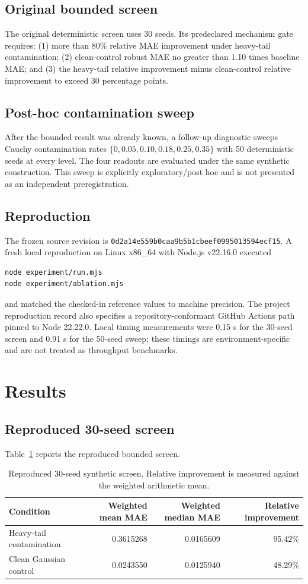 \documentclass[10pt]{article}
\begin{document}
\subsection{Original bounded screen}
The original deterministic screen uses 30 seeds. Its predeclared mechanism gate requires: (1) more than 80\% relative MAE improvement under heavy-tail contamination; (2) clean-control robust MAE no greater than 1.10 times baseline MAE; and (3) the heavy-tail relative improvement minus clean-control relative improvement to exceed 30 percentage points.

\subsection{Post-hoc contamination sweep}
After the bounded result was already known, a follow-up diagnostic sweeps Cauchy contamination rates $\{0,0.05,0.10,0.18,0.25,0.35\}$ with 50 deterministic seeds at every level. The four readouts are evaluated under the same synthetic construction. This sweep is explicitly exploratory/post hoc and is not presented as an independent preregistration.

\subsection{Reproduction}
The frozen source revision is \texttt{0d2a14e559b0caa9b5b1cbeef0995013594ecf15}. A fresh local reproduction on Linux x86\_64 with Node.js v22.16.0 executed
\begin{verbatim}
node experiment/run.mjs
node experiment/ablation.mjs
\end{verbatim}
and matched the checked-in reference values to machine precision. The project reproduction record also specifies a repository-conformant GitHub Actions path pinned to Node 22.22.0. Local timing measurements were 0.15 s for the 30-seed screen and 0.91 s for the 50-seed sweep; these timings are environment-specific and are not treated as throughput benchmarks.

\section{Results}
\subsection{Reproduced 30-seed screen}
Table~\ref{tab:screen} reports the reproduced bounded screen.

\begin{table}[h]
\centering
\caption{Reproduced 30-seed synthetic screen. Relative improvement is measured against the weighted arithmetic mean.}
\label{tab:screen}
\begin{tabular}{lrrr}
\toprule
Condition & Weighted mean MAE & Weighted median MAE & Relative improvement \\
\midrule
Heavy-tail contamination & 0.3615268 & 0.0165609 & 95.42\% \\
Clean Gaussian control & 0.0243550 & 0.0125940 & 48.29\% \\
\bottomrule
\end{tabular}
\end{table}
\end{document}
